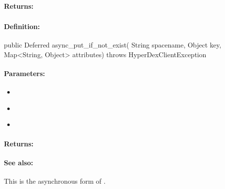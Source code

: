 \paragraph{Returns:}


\pagebreak
\subsubsection{}
\label{api:java:async_put_if_not_exist}


\paragraph{Definition:}
\begin{javacode}
public Deferred async_put_if_not_exist(
        String spacename,
        Object key,
        Map<String, Object> attributes) throws HyperDexClientException
\end{javacode}

\paragraph{Parameters:}
\begin{itemize}[noitemsep]
\item {}\\

\item {}\\

\item {}\\

\end{itemize}

\paragraph{Returns:}


\paragraph{See also:}  This is the asynchronous form of .

